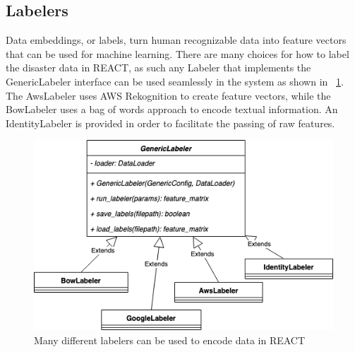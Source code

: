 \subsection{Labelers}
Data embeddings, or labels, turn human recognizable data into feature vectors
that can be used for machine learning. There are many choices for how to 
label the disaster data in REACT, as such any Labeler that implements the 
GenericLabeler interface can be used seamlessly in the system as shown in \figureautorefname{}~\ref{fig:labelers}. The AwsLabeler uses AWS Rekognition 
to create feature vectors, while the BowLabeler uses a bag of words approach 
to encode textual information. An IdentityLabeler is provided in order to 
facilitate the passing of raw features.
\begin{figure}[ht]
    \centering
    \includegraphics[scale=0.6]{images/labelers.png}
    \caption{Many different labelers can be used to encode data in REACT}
    \label{fig:labelers}
\end{figure}

